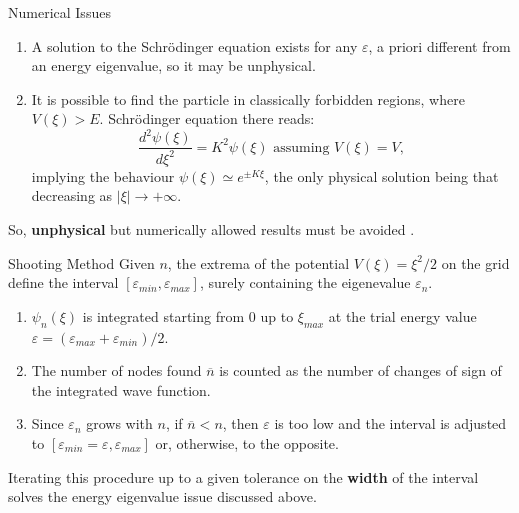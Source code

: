 \documentclass{beamer}
\begin{document}
\begin{frame}{Numerical Issues}
\begin{enumerate}
\item A solution to the Schr\"{o}dinger equation exists for any $\varepsilon$, a priori different from an energy eigenvalue, so it may be unphysical.\\
\vspace{\baselineskip}
\item It is possible to find the particle in classically forbidden regions, where $V(\xi)>E$. Schr\"{o}dinger equation there reads:
$$\frac{d^2\psi(\xi)}{d\xi^2}=K^2\psi(\xi)\text{ assuming }V(\xi)=V,$$
implying the behaviour $\psi(\xi)\simeq e^{\pm K\xi}$, the only physical solution being that decreasing as $|\xi|\to+\infty$.
\end{enumerate}
\vspace{0.5em}
So, \textbf{unphysical} but numerically allowed results must be avoided .
\end{frame}

\begin{frame}{Shooting Method}
Given $n$, the extrema of the potential $V(\xi)=\xi^2/2$ on the grid define the interval $[\varepsilon_{min},\varepsilon_{max}]$, surely containing the eigenevalue $\varepsilon_n$.\\
\vspace{0.5em}
\begin{enumerate}
\setlength\itemsep{0.5em}
\item $\psi_n(\xi)$ is integrated starting from $0$ up to $\xi_{max}$ at the trial energy value $\varepsilon=(\varepsilon_{max}+\varepsilon_{min})/2$.
\item The number of nodes found $\overline{n}$ is counted as the number of changes of sign of the integrated wave function.
\item Since $\varepsilon_n$ grows with $n$, if $\overline{n}<n$, then $\varepsilon$ is too low and the interval is adjusted to $[\varepsilon_{min}=\varepsilon,\varepsilon_{max}]$ or, otherwise, to the opposite.
\end{enumerate}
\vspace{0.5em}
Iterating this procedure up to a given tolerance on the \textbf{width} of the interval solves the energy eigenvalue issue discussed above.
\end{frame}
\end{document}
